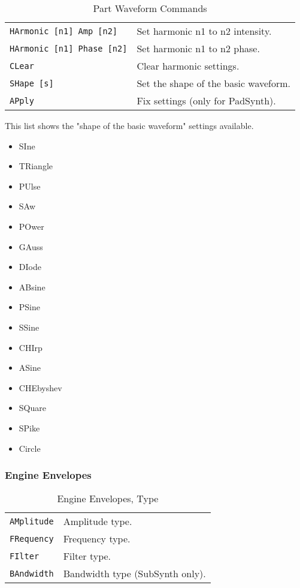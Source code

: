    \begin{table}[H]
      \centering
      \caption{Part Waveform Commands}
      \label{table:yoshimi_part_waveform_commands}
      \begin{tabular}{l l}

   \texttt{HArmonic [n1] Amp [n2]} &
      Set harmonic n1 to n2 intensity. \\
   \texttt{HArmonic [n1] Phase [n2]} &
      Set harmonic n1 to n2 phase. \\
   \texttt{CLear} &
      Clear harmonic settings. \\
   \texttt{SHape [s]} &
      Set the shape of the basic waveform. \\
   \texttt{APply} &
      Fix settings (only for PadSynth). \\

      \end{tabular}
   \end{table}

   This list shows the "shape of the basic waveform" settings available.

   \begin{itemize}
      \item SIne
      \item TRiangle
      \item PUlse
      \item SAw
      \item POwer
      \item GAuss
      \item DIode
      \item ABsine
      \item PSine
      \item SSine
      \item CHIrp
      \item ASine
      \item CHEbyshev
      \item SQuare
      \item SPike
      \item Circle
   \end{itemize}

\subsubsection{Engine Envelopes}
\label{subsec:command_line_engine_envelopes}

   \begin{table}[H]
      \centering
      \caption{Engine Envelopes, Type}
      \label{table:yoshimi_engine_envelopes_types}
      \begin{tabular}{l l}

\texttt{AMplitude} &
   Amplitude type. \\
\texttt{FRequency} &
   Frequency type. \\
\texttt{FIlter} &
   Filter type. \\
\texttt{BAndwidth} &
   Bandwidth type (SubSynth only). \\

      \end{tabular}
   \end{table}

